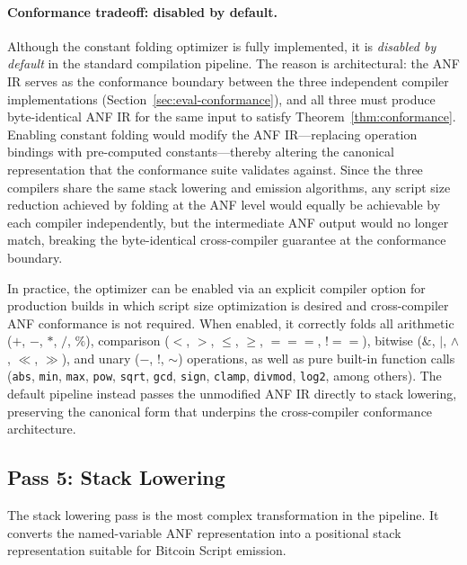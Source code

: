 \documentclass[11pt,a4paper]{article}
\begin{document}
\paragraph{Conformance tradeoff: disabled by default.}
Although the constant folding optimizer is fully implemented, it is
\emph{disabled by default} in the standard compilation pipeline. The
reason is architectural: the ANF IR serves as the conformance boundary
between the three independent compiler implementations
(Section~\ref{sec:eval-conformance}), and all three must produce
byte-identical ANF IR for the same input to satisfy
Theorem~\ref{thm:conformance}. Enabling constant folding would modify the
ANF IR---replacing operation bindings with pre-computed constants---thereby
altering the canonical representation that the conformance suite validates
against. Since the three compilers share the same stack lowering and
emission algorithms, any script size reduction achieved by folding at the
ANF level would equally be achievable by each compiler independently, but
the intermediate ANF output would no longer match, breaking the
byte-identical cross-compiler guarantee at the conformance boundary.

In practice, the optimizer can be enabled via an explicit compiler option
for production builds in which script size optimization is desired and
cross-compiler ANF conformance is not required. When enabled, it correctly
folds all arithmetic ($+$, $-$, $*$, $/$, $\%$), comparison ($<$, $>$,
$\leq$, $\geq$, $===$, $!==$), bitwise ($\&$, $|$, $\wedge$, $\ll$,
$\gg$), and unary ($-$, $!$, $\sim$) operations, as well as pure built-in
function calls (\texttt{abs}, \texttt{min}, \texttt{max}, \texttt{pow},
\texttt{sqrt}, \texttt{gcd}, \texttt{sign}, \texttt{clamp},
\texttt{divmod}, \texttt{log2}, among others). The default pipeline
instead passes the unmodified ANF IR directly to stack lowering, preserving
the canonical form that underpins the cross-compiler conformance
architecture.

\subsection{Pass 5: Stack Lowering}
\label{sec:pass-stack}

The stack lowering pass is the most complex transformation in the pipeline.
It converts the named-variable ANF representation into a positional stack
representation suitable for Bitcoin Script emission.
\end{document}
